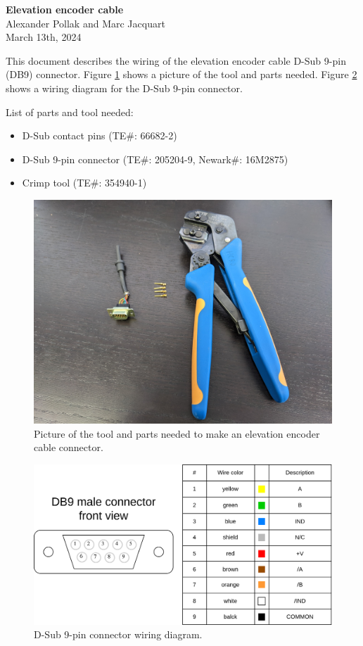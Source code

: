 \documentclass{article}
\begin{document}
\begin{center}
\textbf{\LARGE{Elevation encoder cable}}\\
Alexander Pollak  and Marc Jacquart\\
March 13th, 2024\\
\end{center}


This document describes the wiring of the elevation encoder cable D-Sub 9-pin (DB9) connector. Figure \ref{fig:picture_parts} shows a picture of the tool and parts needed. Figure \ref{fig:diagram_connector} shows a wiring diagram for the D-Sub 9-pin connector.

List of parts and tool needed:
\begin{itemize}
\item D-Sub contact pins (TE\#: 66682-2)
\item D-Sub 9-pin connector (TE\#: 205204-9, Newark\#: 16M2875)
\item Crimp tool (TE\#: 354940-1)
\end{itemize}

\begin{figure}[H]
\includegraphics[width=\textwidth]{images/connector_crimp_tool.jpeg}
\caption{Picture of the tool and parts needed to make an elevation encoder cable connector.}
\label{fig:picture_parts}
\end{figure}

\begin{figure}[H]
\includegraphics[width=\textwidth]{images/schematics/DB9_connector.png}
\caption{D-Sub 9-pin connector wiring diagram.}
\label{fig:diagram_connector}
\end{figure}
\end{document}
